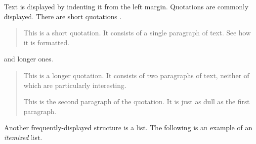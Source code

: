 Text is displayed by indenting it from the left
margin.  Quotations are commonly displayed.  There
are short quotations \citep{jlb-babel}.

\begin{quote}
   This is a short quotation.  It consists of a 
   single paragraph of text.  See how it is formatted.
\end{quote}
and longer ones.
\begin{quotation}
   This is a longer quotation.  It consists of two
   paragraphs of text, neither of which are
   particularly interesting.

   This is the second paragraph of the quotation.  It
   is just as dull as the first paragraph.
\end{quotation}
Another frequently-displayed structure is a list.
The following is an example of an \emph{itemized}
list.